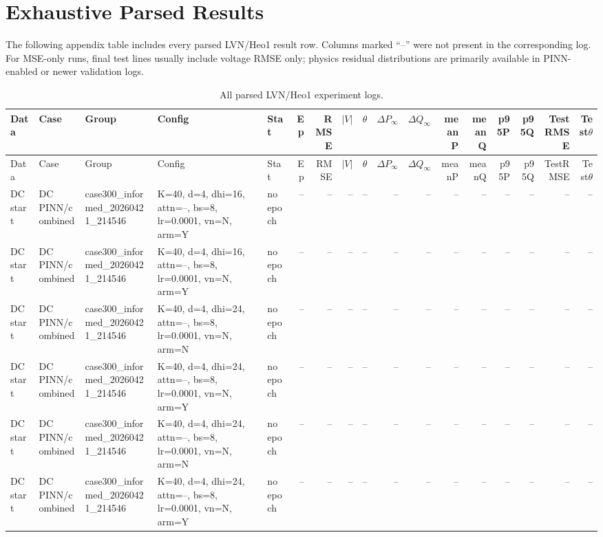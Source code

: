 \documentclass[10pt]{article}
\newcommand{\dP}{\Delta P}
\newcommand{\dQ}{\Delta Q}
\begin{document}
\section{Exhaustive Parsed Results}
The following appendix table includes every parsed LVN/Heo1 result row. Columns marked ``--'' were not present in the corresponding log. For MSE-only runs, final test lines usually include voltage RMSE only; physics residual distributions are primarily available in PINN-enabled or newer validation logs.

\begin{landscape}
\tiny
\begin{longtable}{p{1.25cm}p{1.45cm}p{2.7cm}p{4.2cm}p{0.8cm}rrrrrrrrrrrr}
\caption{All parsed LVN/Heo1 experiment logs.}\\
\toprule
Data & Case & Group & Config & Stat & Ep & RMSE & $|V|$ & $\theta$ & $\dP_\infty$ & $\dQ_\infty$ & meanP & meanQ & p95P & p95Q & TestRMSE & Test$\theta$ \\
\midrule
\endfirsthead
\toprule
Data & Case & Group & Config & Stat & Ep & RMSE & $|V|$ & $\theta$ & $\dP_\infty$ & $\dQ_\infty$ & meanP & meanQ & p95P & p95Q & TestRMSE & Test$\theta$ \\
\midrule
\endhead
DC start & DC PINN/combined & case300\_informed\_20260421\_214546 & K=40, d=4, dhi=16, attn=--, bs=8, lr=0.0001, vn=N, arm=Y & no epoch & -- & -- & -- & -- & -- & -- & -- & -- & -- & -- & -- & -- \\
DC start & DC PINN/combined & case300\_informed\_20260421\_214546 & K=40, d=4, dhi=16, attn=--, bs=8, lr=0.0001, vn=N, arm=Y & no epoch & -- & -- & -- & -- & -- & -- & -- & -- & -- & -- & -- & -- \\
DC start & DC PINN/combined & case300\_informed\_20260421\_214546 & K=40, d=4, dhi=24, attn=--, bs=8, lr=0.0001, vn=N, arm=N & no epoch & -- & -- & -- & -- & -- & -- & -- & -- & -- & -- & -- & -- \\
DC start & DC PINN/combined & case300\_informed\_20260421\_214546 & K=40, d=4, dhi=24, attn=--, bs=8, lr=0.0001, vn=N, arm=Y & no epoch & -- & -- & -- & -- & -- & -- & -- & -- & -- & -- & -- & -- \\
DC start & DC PINN/combined & case300\_informed\_20260421\_214546 & K=40, d=4, dhi=24, attn=--, bs=8, lr=0.0001, vn=N, arm=N & no epoch & -- & -- & -- & -- & -- & -- & -- & -- & -- & -- & -- & -- \\
DC start & DC PINN/combined & case300\_informed\_20260421\_214546 & K=40, d=4, dhi=24, attn=--, bs=8, lr=0.0001, vn=N, arm=Y & no epoch & -- & -- & -- & -- & -- & -- & -- & -- & -- & -- & -- & -- \\

\end{longtable}
\end{landscape}
\end{document}
